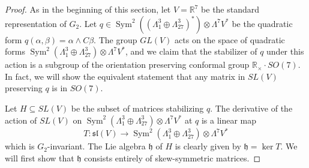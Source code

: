 \documentclass{amsart}
\theoremstyle{theorem}
\theoremstyle{definition}
\theoremstyle{definition}
\theoremstyle{definition}
\theoremstyle{theorem}
\theoremstyle{theorem}
\theoremstyle{theorem}
\theoremstyle{corollary}
\theoremstyle{question}
\theoremstyle{remark}
\DeclareMathOperator{\Sym}{Sym}
\begin{document}
\begin{proof}
    
    As in the beginning of this section, let $V = \mathbb{R}^7$ be the standard representation of $G_2.$ Let $q\in\Sym^2((\Lambda^3_1\oplus\Lambda^3_{27})^*)\otimes\Lambda^7V^*$ be the quadratic form $q(\alpha, \beta) = \alpha\wedge C\beta.$ The group $GL(V)$ acts on the space of quadratic forms $\Sym^2(\Lambda^3_1\oplus\Lambda^3_{27})\otimes\Lambda^7V^*$, and we claim that the stabilizer of $q$ under this action is a subgroup of the orientation preserving conformal group $\mathbb{R}_\times\cdot SO(7).$ In fact, we will show the equivalent statement that any matrix in $SL(V)$ preserving $q$ is in $SO(7).$ 
    
    Let $H\subseteq SL(V)$ be the subset of matrices stabilizing $q.$ The derivative of the action of $SL(V)$ on $\Sym^2(\Lambda^3_1\oplus\Lambda^3_{27})\otimes\Lambda^7V^*$ at $q$ is a linear map $$T:\mathfrak{sl}(V)\to \Sym^2(\Lambda^3_1\oplus\Lambda^3_{27})\otimes\Lambda^7V^*$$ which is $G_2$-invariant. The Lie algebra $\mathfrak{h}$ of $H$ is clearly given by $\mathfrak{h} = \ker T.$ We will first show that $\mathfrak{h}$ consists entirely of skew-symmetric matrices. 
    

\end{proof}
\end{document}

